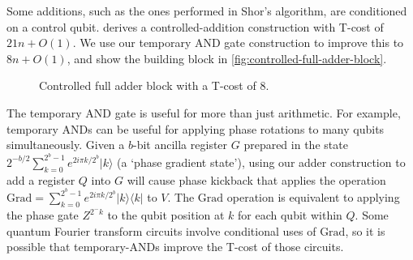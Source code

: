 \documentclass[twocolumn,longbibliography]{quantumarticle-customized}
\begin{document}
Some additions, such as the ones performed in Shor's algorithm, are conditioned on a control qubit.
\cite{Coreas2017} derives a controlled-addition construction with T-cost of $21n + O(1)$.
We use our temporary AND gate construction to improve this to $8n + O(1)$, and show the building block in \autoref{fig:controlled-full-adder-block}.

\begin{figure}
  \caption{
	Controlled full adder block with a T-cost of 8.
  }
  \label{fig:controlled-full-adder-block}
\end{figure}

The temporary AND gate is useful for more than just arithmetic.
For example, temporary ANDs can be useful for applying phase rotations to many qubits simultaneously.
Given a $b$-bit ancilla register $G$ prepared in the state $2^{-b/2} \sum_{k=0}^{2^b-1} e^{2 i \pi k / 2^b} |k\rangle$ (a `phase gradient state'), using our adder construction to add a register $Q$ into $G$ will cause phase kickback that applies the operation $\text{Grad} = \sum_{k=0}^{2^b-1} e^{2 i \pi k / 2^b} |k\rangle \langle k|$ to $V$.
The $\text{Grad}$ operation is equivalent to applying the phase gate $Z^{2^-k}$ to the qubit position at $k$ for each qubit within $Q$.
Some quantum Fourier transform circuits involve conditional uses of $\text{Grad}$, so it is possible that temporary-ANDs improve the T-cost of those circuits.
\end{document}
